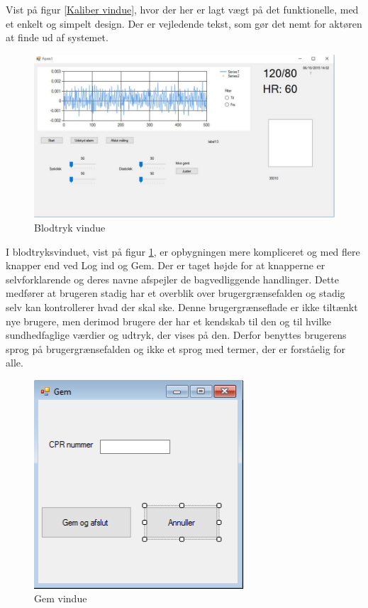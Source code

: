 Vist på figur \ref{Kaliber vindue}, hvor der her er lagt vægt på det funktionelle, med et enkelt og simpelt design. Der er vejledende tekst, som gør det nemt for aktøren at finde ud af systemet.

\begin{figure}[H]
	\centering
	\includegraphics[width=1\textwidth]{Figurer/GUI/GUI_form1}
	\caption{Blodtryk vindue}
	\label{Blodtryk vindue}
\end{figure}

I blodtryksvinduet, vist på figur \ref{Blodtryk vindue}, er opbygningen mere kompliceret og med flere knapper end ved Log ind og Gem. Der er taget højde for at knapperne er selvforklarende og deres navne afspejler de bagvedliggende handlinger. Dette medfører at brugeren stadig har et overblik over brugergrænsefalden og stadig selv kan kontrollerer hvad der skal ske. Denne brugergrænseflade er ikke tiltænkt nye brugere, men derimod brugere der har et kendskab til den og til hvilke sundhedfaglige værdier og udtryk, der vises på den.  Derfor benyttes brugerens sprog på brugergrænsefalden og ikke et sprog med termer, der er forståelig for alle. 

\begin{figure}[H]
	\centering
	\includegraphics[width=0.7\textwidth]{Figurer/GUI/Gem_GUI}
	\caption{Gem vindue}
	\label{Gem vindue}
\end{figure}

